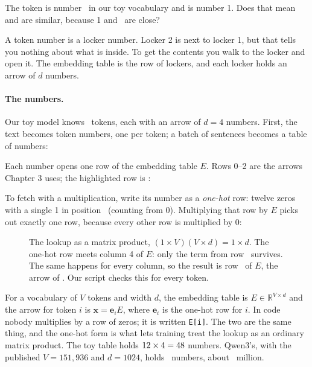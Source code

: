 \Predict The token  is number \nTwoTimeId\ in our toy vocabulary and  is number 1. Does
that mean  and  are similar, because 1 and \nTwoTimeId\ are close?

\Picture A token number is a locker number. Locker 2 is next to locker 1, but that tells you nothing
about what is inside. To get the contents you walk to the locker and open it. The embedding table is the
row of lockers, and each locker holds an arrow of $d$ numbers.

\paragraph{The numbers.} Our toy model knows \nTwoVocabSize\ tokens, each with an arrow of $d=4$ numbers.
First, the text becomes token numbers, one per token; a batch of sentences becomes a table of numbers:
\begin{center}\end{center}
Each number opens one row of the embedding table $E$. Rows 0--2 are the arrows Chapter 3 uses; the
highlighted row is :
\begin{center}\end{center}
To fetch  with a multiplication, write its number as a \emph{one-hot} row: twelve zeros with a
single 1 in position \nTwoTimeId\ (counting from 0). Multiplying that row by $E$ picks out exactly one row,
because every other row is multiplied by 0:
\begin{figure}[!htb]\centering
\resizebox{\linewidth}{!}{}
\caption{The lookup as a matrix product, $(1\times V)(V\times d)=1\times d$. The one-hot row meets column 4
of $E$: only the term from row \nTwoTimeId\ survives. The same happens for every column, so the result is row
\nTwoTimeId\ of $E$, the arrow of . Our script checks this for every token.}
\end{figure}

\Exactly For a vocabulary of $V$ tokens and width $d$, the embedding table is $E\in\mathbb{R}^{V\times d}$
and the arrow for token $i$ is $\bm{x} = \bm{e}_i E$, where $\bm{e}_i$ is the one-hot row for $i$. In code
nobody multiplies by a row of zeros; it is written \texttt{E[i]}. The two are the same thing, and the
one-hot form is what lets training treat the lookup as an ordinary matrix product. The toy table holds
$12\times4=48$ numbers. Qwen3's, with the published $V=151{,}936$ and $d=1024$, holds
\nTwoQwenEmbParams\ numbers, about \nTwoQwenEmbMillions\ million.

